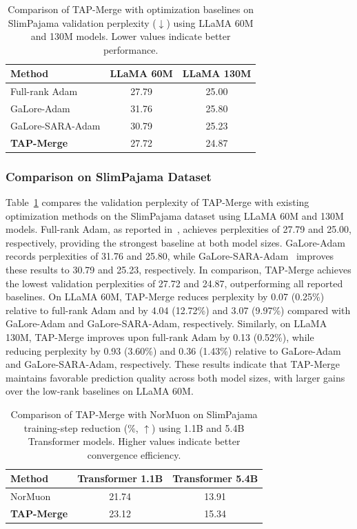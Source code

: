 \documentclass[fleqn,10pt]{wlscirep}
\begin{document}
\begin{table}[t]
\centering\small
\caption{Comparison of TAP-Merge with optimization
baselines on SlimPajama validation perplexity
($\downarrow$) using LLaMA 60M and 130M models.
Lower values indicate better performance.}
\label{tab:slim_ppl}
\begin{tabular}{lcc}
\toprule
Method & LLaMA 60M & LLaMA 130M\\
\midrule
Full-rank Adam & 27.79 & 25.00\\
GaLore-Adam & 31.76 & 25.80\\
GaLore-SARA-Adam & 30.79 & 25.23\\
\midrule
\textbf{TAP-Merge} & 27.72 & 24.87\\ \bottomrule
\end{tabular}
\end{table}


\subsubsection{Comparison on SlimPajama Dataset}
\label{subsec:performance_slimpajama}
Table~\ref{tab:slim_ppl} compares the validation perplexity of TAP-Merge with existing optimization methods on the SlimPajama dataset using LLaMA 60M and 130M models. Full-rank Adam, as reported in~\cite{sara2025}, achieves perplexities of 27.79 and 25.00, respectively, providing the strongest baseline at both model sizes. GaLore-Adam~\cite{galore2024} records perplexities of 31.76 and 25.80, while GaLore-SARA-Adam~\cite{sara2025} improves these results to 30.79 and 25.23, respectively. In comparison, TAP-Merge achieves the lowest validation perplexities of 27.72 and 24.87, outperforming all reported baselines. On LLaMA 60M, TAP-Merge reduces perplexity by 0.07 (0.25\%) relative to full-rank Adam and by 4.04 (12.72\%) and 3.07 (9.97\%) compared with GaLore-Adam and GaLore-SARA-Adam, respectively. Similarly, on LLaMA 130M, TAP-Merge improves upon full-rank Adam by 0.13 (0.52\%), while reducing perplexity by 0.93 (3.60\%) and 0.36 (1.43\%) relative to GaLore-Adam and GaLore-SARA-Adam, respectively. These results indicate that TAP-Merge maintains favorable prediction quality across both model sizes, with larger gains over the low-rank baselines on LLaMA 60M.

\begin{table}[t]
\centering\small
\caption{Comparison of TAP-Merge with NorMuon
on SlimPajama training-step reduction
($\%$, $\uparrow$) using 1.1B and 5.4B
Transformer models. Higher values
indicate better convergence efficiency.}
\label{tab:slim_steps}
\begin{tabular}{lcc}
\toprule
Method & Transformer 1.1B & Transformer 5.4B\\
\midrule
NorMuon~\cite{normuon2026} & 21.74 & 13.91\\
\midrule
\textbf{TAP-Merge} & 23.12 & 15.34\\ \bottomrule
\end{tabular}
\end{table}
\end{document}
